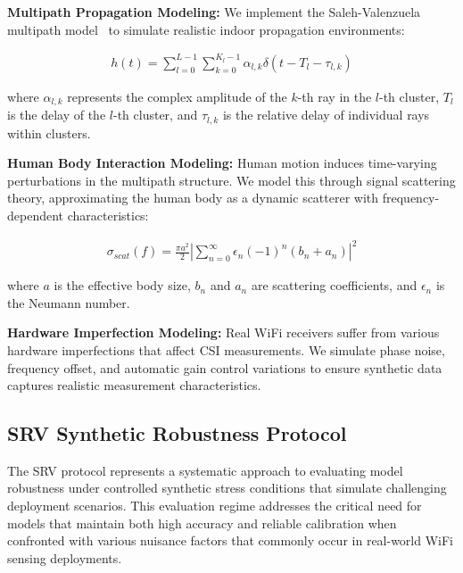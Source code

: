 \documentclass[lettersize,journal]{IEEEtran}
\begin{document}
\textbf{Multipath Propagation Modeling:} We implement the Saleh-Valenzuela multipath model~\cite{saleh1987statistical} to simulate realistic indoor propagation environments:

\begin{tcolorbox}[colback=purple!5!white,colframe=purple!50!black,title=\textbf{Multipath Channel Modeling}]
\begin{align}
h(t) = \sum_{l=0}^{L-1}\sum_{k=0}^{K_l-1} \alpha_{l,k} \delta(t - T_l - \tau_{l,k})
\end{align}
\end{tcolorbox}

where $\alpha_{l,k}$ represents the complex amplitude of the $k$-th ray in the $l$-th cluster, $T_l$ is the delay of the $l$-th cluster, and $\tau_{l,k}$ is the relative delay of individual rays within clusters.

\textbf{Human Body Interaction Modeling:} Human motion induces time-varying perturbations in the multipath structure. We model this through signal scattering theory, approximating the human body as a dynamic scatterer with frequency-dependent characteristics:

\begin{tcolorbox}[colback=red!5!white,colframe=red!50!black,title=\textbf{Human Body Scattering Model}]
\begin{align}
\sigma_{scat}(f) = \frac{\pi a^2}{2} \left| \sum_{n=0}^{\infty} \epsilon_n (-1)^n (b_n + a_n) \right|^2
\end{align}
\end{tcolorbox}
where $a$ is the effective body size, $b_n$ and $a_n$ are scattering coefficients, and $\epsilon_n$ is the Neumann number.

\textbf{Hardware Imperfection Modeling:} Real WiFi receivers suffer from various hardware imperfections that affect CSI measurements. We simulate phase noise, frequency offset, and automatic gain control variations to ensure synthetic data captures realistic measurement characteristics.

\subsection{SRV Synthetic Robustness Protocol}

The SRV protocol represents a systematic approach to evaluating model robustness under controlled synthetic stress conditions that simulate challenging deployment scenarios. This evaluation regime addresses the critical need for models that maintain both high accuracy and reliable calibration when confronted with various nuisance factors that commonly occur in real-world WiFi sensing deployments.
\end{document}
